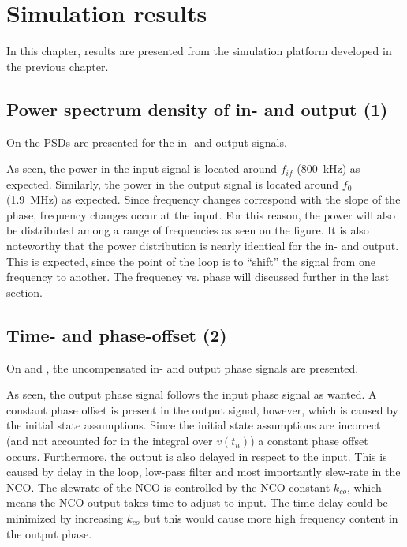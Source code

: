 \chapter{Simulation results} \label{ch:intro}
In this chapter, results are presented from the simulation platform developed in the previous chapter.
 
\section{Power spectrum density of in- and output (1)}
On  the PSDs are presented for the in- and output signals.


As seen, the power in the input signal is located around $f_{if}$ (\SI{800}{\kilo\hertz}) as expected. Similarly, the power in the output signal is located around $f_0$ (\SI{1.9}{\mega\hertz}) as expected. Since frequency changes correspond with the slope of the phase, frequency changes occur at the input. For this reason, the power will also be distributed among a range of frequencies as seen on the figure. It is also noteworthy that the power distribution is nearly identical for the in- and output. This is expected, since the point of the loop is to ``shift'' the signal from one frequency to another. The frequency vs. phase will discussed further in the last section.

\section{Time- and phase-offset (2)}
On  and , the uncompensated in- and output phase signals are presented.


As seen, the output phase signal follows the input phase signal as wanted. A constant phase offset is present in the output signal, however, which is caused by the initial state assumptions. Since the initial state assumptions are incorrect (and not accounted for in the integral over $v(t_n)$) a constant phase offset occurs. Furthermore, the output is also delayed in respect to the input. This is caused by delay in the loop, low-pass filter and most importantly slew-rate in the NCO. The slewrate of the NCO is controlled by the NCO constant $k_{co}$, which means the NCO output takes time to adjust to input. The time-delay could be minimized by increasing $k_{co}$ but this would cause more high frequency content in the output phase.


